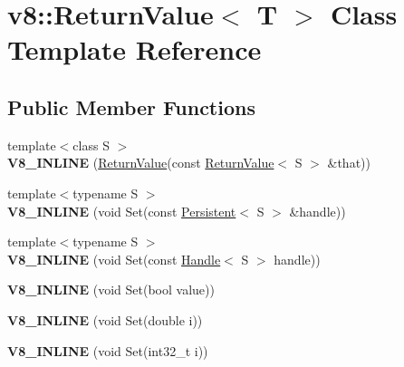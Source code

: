 \hypertarget{classv8_1_1_return_value}{}\section{v8\+:\+:Return\+Value$<$ T $>$ Class Template Reference}
\label{classv8_1_1_return_value}
\subsection*{Public Member Functions}
\begin{DoxyCompactItemize}
\item 
\hypertarget{classv8_1_1_return_value_a86be5fad1e3f276cffcb729912b4c56b}{}{\footnotesize template$<$class S $>$ }\\{\bfseries V8\+\_\+\+I\+N\+L\+I\+N\+E} (\hyperlink{classv8_1_1_return_value}{Return\+Value}(const \hyperlink{classv8_1_1_return_value}{Return\+Value}$<$ S $>$ \&that))\label{classv8_1_1_return_value_a86be5fad1e3f276cffcb729912b4c56b}

\item 
\hypertarget{classv8_1_1_return_value_a0a6c5edad337edce021db01610fc17d9}{}{\footnotesize template$<$typename S $>$ }\\{\bfseries V8\+\_\+\+I\+N\+L\+I\+N\+E} (void Set(const \hyperlink{classv8_1_1_persistent}{Persistent}$<$ S $>$ \&handle))\label{classv8_1_1_return_value_a0a6c5edad337edce021db01610fc17d9}

\item 
\hypertarget{classv8_1_1_return_value_ae8a697fa0ca9946250dd5923c9bdd0dd}{}{\footnotesize template$<$typename S $>$ }\\{\bfseries V8\+\_\+\+I\+N\+L\+I\+N\+E} (void Set(const \hyperlink{classv8_1_1_handle}{Handle}$<$ S $>$ handle))\label{classv8_1_1_return_value_ae8a697fa0ca9946250dd5923c9bdd0dd}

\item 
\hypertarget{classv8_1_1_return_value_a9af0302f0270d99157c798539323610a}{}{\bfseries V8\+\_\+\+I\+N\+L\+I\+N\+E} (void Set(bool value))\label{classv8_1_1_return_value_a9af0302f0270d99157c798539323610a}

\item 
\hypertarget{classv8_1_1_return_value_a24159ede18168127ff22897854dc816c}{}{\bfseries V8\+\_\+\+I\+N\+L\+I\+N\+E} (void Set(double i))\label{classv8_1_1_return_value_a24159ede18168127ff22897854dc816c}

\item 
\hypertarget{classv8_1_1_return_value_af16c340dc3a92177bb7f4d640d001808}{}{\bfseries V8\+\_\+\+I\+N\+L\+I\+N\+E} (void Set(int32\+\_\+t i))\label{classv8_1_1_return_value_af16c340dc3a92177bb7f4d640d001808}


\end{DoxyCompactItemize}
